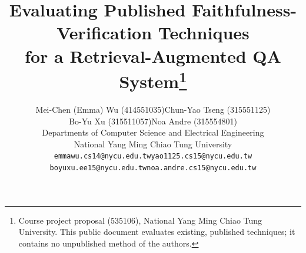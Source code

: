 \documentclass{article}
\title{Evaluating Published Faithfulness-Verification Techniques\\ for a Retrieval-Augmented QA System\thanks{Course project proposal (535106), National Yang Ming Chiao Tung University. This public document evaluates existing, published techniques; it contains no unpublished method of the authors.}}
\author{%
  Mei-Chen (Emma) Wu (414551035)\quad Chun-Yao Tseng (315551125)\\ Bo-Yu Xu (315511057)\quad Noa Andre (315554801)\\
  Departments of Computer Science and Electrical Engineering\\
  National Yang Ming Chiao Tung University\\
  \texttt{emmawu.cs14@nycu.edu.tw}\quad \texttt{yao1125.cs15@nycu.edu.tw}\\ \texttt{boyuxu.ee15@nycu.edu.tw}\quad \texttt{noa.andre.cs15@nycu.edu.tw}
}
\begin{document}
\maketitle














\newpage
{
\small


}
\end{document}
